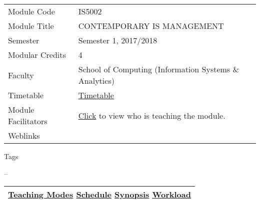 \hypertarget{ctl00_ctl00_ContentPlaceHolder1_ContentPlaceHolder1_LV_itemPlaceholderContainer}{}
\begin{longtable}[]{@{}ll@{}}
\toprule
\protect\hypertarget{ctl00_ctl00_ContentPlaceHolder1_ContentPlaceHolder1_LV_ctrl0_txtCode}{}{Module
Code} &
\protect\hypertarget{ctl00_ctl00_ContentPlaceHolder1_ContentPlaceHolder1_LV_ctrl0_lcCode}{}{IS5002}\tabularnewline
\protect\hypertarget{ctl00_ctl00_ContentPlaceHolder1_ContentPlaceHolder1_LV_ctrl0_lcCourse}{}{Module
Title} &
\protect\hypertarget{ctl00_ctl00_ContentPlaceHolder1_ContentPlaceHolder1_LV_ctrl0_lcCourseName}{}{CONTEMPORARY
IS MANAGEMENT}\tabularnewline
\protect\hypertarget{ctl00_ctl00_ContentPlaceHolder1_ContentPlaceHolder1_LV_ctrl0_lcSemester}{}{Semester}
&
\protect\hypertarget{ctl00_ctl00_ContentPlaceHolder1_ContentPlaceHolder1_LV_ctrl0_lcSem}{}{Semester
1, 2017/2018}\tabularnewline
\protect\hypertarget{ctl00_ctl00_ContentPlaceHolder1_ContentPlaceHolder1_LV_ctrl0_lcModCredit}{}{Modular
Credits} &
\protect\hypertarget{ctl00_ctl00_ContentPlaceHolder1_ContentPlaceHolder1_LV_ctrl0_lcModC}{}{4}\tabularnewline
\protect\hypertarget{ctl00_ctl00_ContentPlaceHolder1_ContentPlaceHolder1_LV_ctrl0_lcFaculty}{}{Faculty}
&
\protect\hypertarget{ctl00_ctl00_ContentPlaceHolder1_ContentPlaceHolder1_LV_ctrl0_lcFac}{}{School
of Computing (Information Systems \& Analytics)}\tabularnewline
\protect\hypertarget{ctl00_ctl00_ContentPlaceHolder1_ContentPlaceHolder1_LV_ctrl0_Label1}{}{Timetable}
&
\protect\hypertarget{ctl00_ctl00_ContentPlaceHolder1_ContentPlaceHolder1_LV_ctrl0_Span1}{}{\href{javascript:void(0);}{Timetable}}\tabularnewline
\protect\hypertarget{ctl00_ctl00_ContentPlaceHolder1_ContentPlaceHolder1_LV_ctrl0_Label6}{}{Module
Facilitators} &
\protect\hypertarget{ctl00_ctl00_ContentPlaceHolder1_ContentPlaceHolder1_LV_ctrl0_Span2}{}{\href{list_lecturers.aspx?CourseID=4fac87a1-99eb-4940-a628-c7cf0c6dd7d2\&ClickFrom=}{Click}
to view who is teaching the module.}\tabularnewline
\protect\hypertarget{ctl00_ctl00_ContentPlaceHolder1_ContentPlaceHolder1_LV_ctrl0_LabelCtrl1}{}{Weblinks}
&\tabularnewline
\bottomrule
\end{longtable}

\protect\hypertarget{ctl00_ctl00_ContentPlaceHolder1_ContentPlaceHolder1_LV_ctrl0_Label4}{}{Tags}

\protect\hypertarget{ctl00_ctl00_ContentPlaceHolder1_ContentPlaceHolder1_LV_ctrl0_lblTags}{}{--}

\begin{longtable}[]{@{}l@{}}
\toprule
\protect\hypertarget{ctl00_ctl00_ContentPlaceHolder1_ContentPlaceHolder1_lblSectionMiddle}{}{\protect\hyperlink{Teachingux5cux2520Modes}{Teaching
Modes} \textbar{} \protect\hyperlink{Schedule}{Schedule} \textbar{}
\protect\hyperlink{Synopsis}{Synopsis} \textbar{}
\protect\hyperlink{Workload}{Workload}}\tabularnewline
\bottomrule
\end{longtable}


